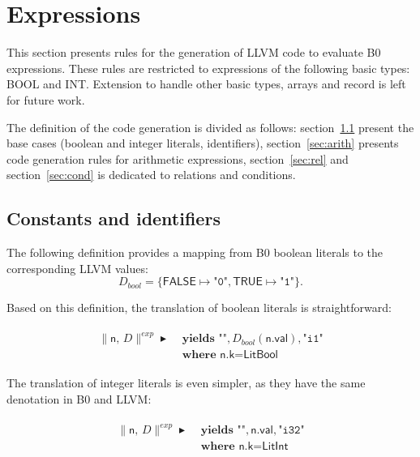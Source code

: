 \documentclass{article}
\newcommand{\trad}[2]{\ensuremath{\lVert \textsf{#1} \rVert^{\textit{#2}}}}
\DeclareMathOperator{\isdef}{\blacktriangleright}
\begin{document}
\section{Expressions}
\label{sec:expr}

This section presents rules for the generation of LLVM code to
evaluate B0 expressions. These rules are restricted to expressions of
the following basic types: \textsf{BOOL} and \textsf{INT}. Extension
to handle other basic types, arrays and record is left for future
work.

The definition of the code generation is divided as follows:
section~\ref{sec:const} present the base cases (boolean and integer
literals, identifiers), section~\ref{sec:arith} presents code
generation rules for arithmetic expressions, section~\ref{sec:rel} and
section~\ref{sec:cond} is dedicated to relations and conditions.

\subsection{Constants and identifiers}
\label{sec:const}

The following definition provides a mapping from B0 boolean literals
to the corresponding LLVM values:
$$D_{bool} = \{ \textsf{FALSE} \mapsto \texttt{"0"}, \textsf{TRUE} \mapsto \texttt{"1"} \}.$$

Based on this definition, the translation of boolean literals is straightforward:
\begin{framed}
\begin{align}
\begin{split}
  \trad{n, $D$}{exp} \isdef & \textbf{ yields } \texttt{""}, D_{bool}(\textsf{n.val}), \texttt{"i1"} \\
  & \textbf{ where } \textsf{n.k} = \textsf{LitBool}
\end{split}
\end{align}
\end{framed}

The translation of integer literals is even simpler, as they have the
same denotation in B0 and LLVM:
\begin{framed}
\begin{align}
\begin{split}
  \trad{n, $D$}{exp} \isdef & \textbf{ yields } \texttt{""}, \textsf{n.val}, \texttt{"i32"} \\
  & \textbf{ where } \textsf{n.k} = \textsf{LitInt}
\end{split}
\end{align}
\end{framed}
\end{document}
